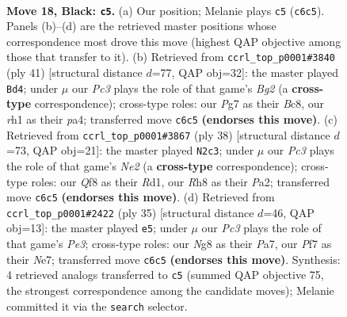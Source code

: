 \documentclass[11pt]{article}
\begin{document}
\clearpage

\begin{figure}[p]\centering
\begin{subfigure}{0.46\textwidth}\centering
\resizebox{\linewidth}{!}{%
\newchessgame
\chessboard[
  setfen={2k2qnr/p1p2ppp/1pp5/8/8/2PB1P2/bP1Q2PP/2K4R b - - 3 18},
  showmover=false,
  pgfstyle=straightmove, color=movearrow, markmove={c6-c5}
]}
\caption{}
\end{subfigure}\hfill
\begin{subfigure}{0.46\textwidth}\centering
\resizebox{\linewidth}{!}{%
\newchessgame
\chessboard[
  setfen={2bq2k1/rpp2pb1/3p2pp/8/P1P5/1Q1P2P1/3B1PBP/4R1K1 b - - 0 21},
  showmover=false,
  pgfstyle=straightmove, color=movearrow, markmove={g7-d4}
]}
\caption{}
\end{subfigure}
\\[4pt]
\begin{subfigure}{0.46\textwidth}\centering
\resizebox{\linewidth}{!}{%
\newchessgame
\chessboard[
  setfen={1kq2b1r/2p3pp/ppn5/4p3/4N2P/5P2/PPP1NQP1/1K1R4 w - - 0 20},
  showmover=false,
  pgfstyle=straightmove, color=movearrow, markmove={e2-c3}
]}
\caption{}
\end{subfigure}\hfill
\begin{subfigure}{0.46\textwidth}\centering
\resizebox{\linewidth}{!}{%
\newchessgame
\chessboard[
  setfen={r2q3k/pp2n1pp/2ppp3/8/4PB1P/2PP2Q1/PP4P1/R5K1 b - - 0 18},
  showmover=false,
  pgfstyle=straightmove, color=movearrow, markmove={e6-e5}
]}
\caption{}
\end{subfigure}
\caption{\textbf{Move 18, Black: \texttt{c5}.} (a) Our position; Melanie plays \texttt{c5} (\texttt{c6c5}). Panels (b)--(d) are the retrieved master positions whose correspondence most drove this move (highest QAP objective among those that transfer to it). (b) Retrieved from \texttt{ccrl\_top\_p0001\#3840} (ply 41) [structural distance $d$=77, QAP obj=32]: the master played \texttt{Bd4}; under $\mu$ our \emph{Pc3} plays the role of that game's \emph{Bg2} (a \textbf{cross-type} correspondence); cross-type roles: our \emph{P}g7 as their \emph{B}c8, our \emph{r}h1 as their \emph{p}a4; transferred move \texttt{c6c5} \textbf{(endorses this move)}. (c) Retrieved from \texttt{ccrl\_top\_p0001\#3867} (ply 38) [structural distance $d$=73, QAP obj=21]: the master played \texttt{N2c3}; under $\mu$ our \emph{Pc3} plays the role of that game's \emph{Ne2} (a \textbf{cross-type} correspondence); cross-type roles: our \emph{Q}f8 as their \emph{R}d1, our \emph{R}h8 as their \emph{P}a2; transferred move \texttt{c6c5} \textbf{(endorses this move)}. (d) Retrieved from \texttt{ccrl\_top\_p0001\#2422} (ply 35) [structural distance $d$=46, QAP obj=13]: the master played \texttt{e5}; under $\mu$ our \emph{Pc3} plays the role of that game's \emph{Pe3}; cross-type roles: our \emph{N}g8 as their \emph{P}a7, our \emph{P}f7 as their \emph{N}e7; transferred move \texttt{c6c5} \textbf{(endorses this move)}. Synthesis: 4 retrieved analogs transferred to \texttt{c5} (summed QAP objective 75, the strongest correspondence among the candidate moves); Melanie committed it via the \texttt{search} selector.}
\label{fig:thought-m35}
\end{figure}
\end{document}
